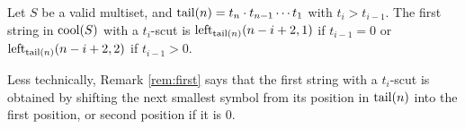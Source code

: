 \begin{remark}
\label{rem:first}
Let $S$ be a valid multiset, and $\tail(n) = t_n \cdot t_{n-1} \cdots t_1$ with $t_i > t_{i-1}$.
The first string in $\cool{S}$ with a $t_i$-scut is $\lshiftindex[\tail(n)]{n-i+2}{1}$ if $t_{i-1} = 0$ or $\lshiftindex[\tail(n)]{n-i+2}{2}$ if $t_{i-1} > 0$.
\end{remark}

Less technically, Remark \ref{rem:first} says that the first string with a $t_i$-scut is obtained by shifting the next smallest symbol from its position in $\tail(n)$ into the first position, or second position if it is $0$.


